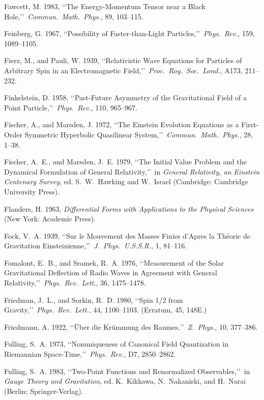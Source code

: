 \item Fawcett, M. 1983, \lq\lq The Energy-Momentum Tensor near a Black Hole,\rq\rq\ \emph{Commun.\ Math.\ Phys.}, 89, 103--115.
\item Feinberg, G. 1967, \lq\lq Possibility of Faster-than-Light Particles,\rq\rq\ \emph{Phys.\ Rev.}, 159, 1089--1105.
\item Fierz, M., and Pauli, W. 1939, \lq\lq Relativistic Wave Equations for Particles of Arbitrary Spin in an Electromagnetic Field,\rq\rq\ \emph{Proc.\ Roy.\ Soc.\ Lond.}, A173, 211--232.
\item Finkelstein, D. 1958, \lq\lq Past-Future Asymmetry of the Gravitational Field of a Point Particle,\rq\rq\ \emph{Phys.\ Rev.}, 110, 965--967.
\item Fischer, A., and Marsden, J. 1972, \lq\lq The Einstein Evolution Equations as a First-Order Symmetric Hyperbolic Quasilinear System,\rq\rq\ \emph{Commun.\ Math.\ Phys.}, 28, 1--38.
\item Fischer, A.~E., and Marsden, J.~E. 1979, \lq\lq The Initial Value Problem and the Dynamical Formulation of General Relativity,\rq\rq\ in \emph{General Relativity, an Einstein Centenary Survey}, ed. S.~W.~Hawking and W.~Israel (Cambridge: Cambridge University Press).
\item Flanders, H. 1963, \emph{Differential Forms with Applications to the Physical Sciences} (New York: Academic Press).
\item Fock, V.~A. 1939, \lq\lq Sur le Mouvement des Masses Finies d'Apres la Th\'eorie de Gravitation Einsteinienne,\rq\rq\ \emph{J.\ Phys.\ U.S.S.R.}, 1, 81--116.
\item Fomalont, E.~B., and Sramek, R.~A. 1976, \lq\lq Measurement of the Solar Gravitational Deflection of Radio Waves in Agreement with General Relativity,\rq\rq\ \emph{Phys.\ Rev.\ Lett.}, 36, 1475--1478.
\item Friedman, J.~L., and Sorkin, R.~D. 1980, \lq\lq Spin 1/2 from Gravity,\rq\rq\ \emph{Phys.\ Rev.\ Lett.}, 44, 1100--1103. (Erratum, 45, 148E.)
\item Friedmann, A. 1922, \lq\lq {\"U}ber die Kr{\"u}mmung des Raumes,\rq\rq\ \emph{Z.\ Phys.}, 10, 377--386.
\item Fulling, S.~A. 1973, \lq\lq Nonuniqueness of Canonical Field Quantization in Riemannian Space-Time,\rq\rq\ \emph{Phys.\ Rev.}, D7, 2850--2862.
\item Fulling, S.~A. 1983, \lq\lq Two-Point Functions and Renormalized Observables,\rq\rq\ in \emph{Gauge Theory and Gravitation}, ed. K.~Kikkawa, N.~Nakaniski, and H.~Narai (Berlin: Springer-Verlag).
